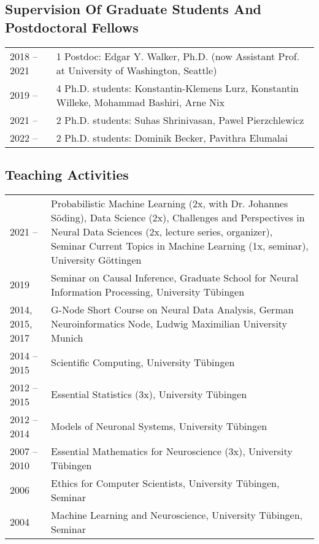 \documentclass[COG,11pt]{ercgrant}
\begin{document}
\subsection{Supervision Of Graduate Students And Postdoctoral Fellows}
\begin{tabular}{p{3cm}p{12cm}}
2018 -- 2021 & 1 Postdoc: Edgar Y. Walker, Ph.D. (now Assistant Prof. at University of Washington, Seattle)\\
2019 -- & 4 Ph.D. students: Konstantin-Klemens Lurz, Konstantin Willeke, Mohammad Bashiri, Arne Nix\\
2021 -- & 2 Ph.D. students: Suhas Shrinivasan, Pawel Pierzchlewicz\\
2022 -- & 2 Ph.D. students: Dominik Becker, Pavithra Elumalai
\end{tabular}

\subsection{Teaching Activities}
\begin{tabular}{p{3.5cm}p{11.5cm}}
2021 --  & Probabilistic Machine Learning (2x, with Dr. Johannes Söding), Data Science (2x), Challenges and Perspectives in Neural Data Sciences (2x, lecture series, organizer), Seminar Current Topics in Machine Learning (1x, seminar), University Göttingen\\
2019 & Seminar on Causal Inference, Graduate School for Neural Information Processing, University Tübingen \\
2014, 2015, 2017  & G-Node Short Course on Neural Data Analysis, German Neuroinformatics Node, Ludwig Maximilian University Munich\\
2014 -- 2015 &  Scientific Computing, University T\"ubingen\\
2012 -- 2015 & Essential Statistics (3x), University T\"ubingen \\
2012 -- 2014 & Models of Neuronal Systems, University T\"ubingen\\
2007 -- 2010 & Essential Mathematics for Neuroscience (3x), University T\"ubingen\\
2006 & Ethics for Computer Scientists, University T\"ubingen, Seminar\\
2004 & Machine Learning and Neuroscience, University T\"ubingen, Seminar\\ 
\end{tabular}
\end{document}
